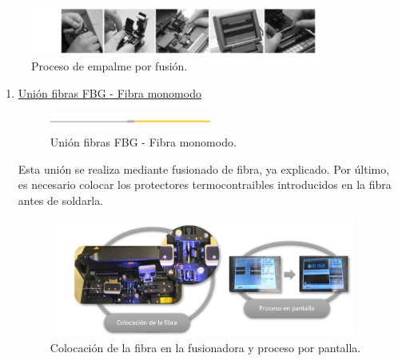 \begin{itemize}
	\begin{figure}[H]
		\centering
		\includegraphics[width=0.85\textwidth]{./img/procesoFusion}
		\caption{Proceso de empalme por fusión. \cite{FOAconect}} 
		\label{fig:procFusion}
	\end{figure}
	
	
	\begin{enumerate}
		\item \underline{Unión fibras FBG - Fibra monomodo}
		
	\begin{figure}[H]
		\centering
		\includegraphics[width=0.5\textwidth]{./img/union1}
		\caption{Unión fibras FBG - Fibra monomodo.} 
		\label{fig:union1}
	\end{figure}  
	
	Esta unión se realiza mediante fusionado de fibra, ya explicado. %
	Por último, es necesario colocar los protectores termocontraibles introducidos en la fibra antes de soldarla.
	
	\begin{figure}[H]
		\centering
		\includegraphics[width=0.95\textwidth]{./img/fusionFOpractica}
		\caption{Colocación de la fibra en la fusionadora y proceso por pantalla.} 
		\label{fig:fusionadora}
	\end{figure}  
	

\end{enumerate}
\end{itemize}
